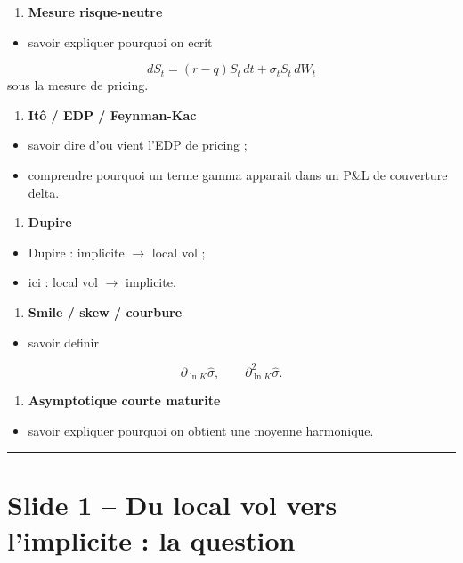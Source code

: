 \documentclass[11pt,a4paper]{article}
\begin{document}
\begin{enumerate}
\item \textbf{Mesure risque-neutre}
\end{enumerate}
\begin{itemize}
\item savoir expliquer pourquoi on ecrit
\end{itemize}
\[
   dS_t=(r-q)S_t\,dt+\sigma_t S_t\,dW_t
\]
   sous la mesure de pricing.

\begin{enumerate}
\item \textbf{Itô / EDP / Feynman-Kac}
\end{enumerate}
\begin{itemize}
\item savoir dire d'ou vient l'EDP de pricing ;
\item comprendre pourquoi un terme gamma apparait dans un P\&{}L de couverture delta.
\end{itemize}

\begin{enumerate}
\item \textbf{Dupire}
\end{enumerate}
\begin{itemize}
\item Dupire : implicite \(\to\) local vol ;
\item ici : local vol \(\to\) implicite.
\end{itemize}

\begin{enumerate}
\item \textbf{Smile / skew / courbure}
\end{enumerate}
\begin{itemize}
\item savoir definir
\end{itemize}
\[
   \partial_{\ln K}\hat{\sigma},\qquad \partial^2_{\ln K}\hat{\sigma}.
\]

\begin{enumerate}
\item \textbf{Asymptotique courte maturite}
\end{enumerate}
\begin{itemize}
\item savoir expliquer pourquoi on obtient une moyenne harmonique.
\end{itemize}

\bigskip\hrule\bigskip

\section{Slide 1 -- Du local vol vers l'implicite : la question}
\end{document}
